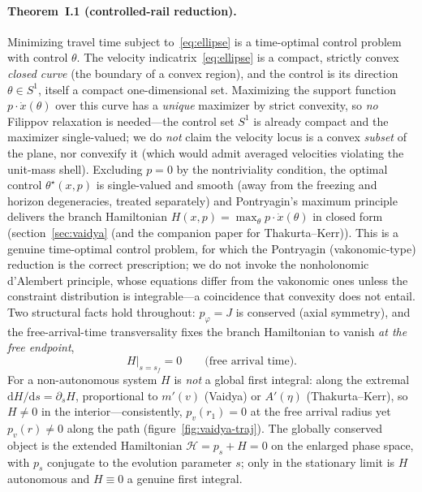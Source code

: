\documentclass[12pt]{iopart}
\newcommand{\dd}{\mathrm{d}}
\begin{document}
\paragraph{Theorem~I.1 (controlled-rail reduction).} Minimizing travel time subject
to~\eqref{eq:ellipse} is a time-optimal control problem with control $\theta$.
The velocity indicatrix~\eqref{eq:ellipse} is a compact, strictly convex
\emph{closed curve} (the boundary of a convex region), and the control is its
direction $\theta\in S^1$, itself a compact one-dimensional set. Maximizing the
support function $p\cdot\dot x(\theta)$ over this curve has a \emph{unique} maximizer
by strict convexity, so \emph{no} Filippov relaxation is needed---the control set
$S^1$ is already compact and the maximizer single-valued; we do \emph{not} claim the
velocity locus is a convex \emph{subset} of the plane, nor convexify it (which would
admit averaged velocities violating the unit-mass shell). Excluding $p=0$ by the
nontriviality condition, the optimal control $\theta^\star(x,p)$ is single-valued and
smooth (away from the freezing and horizon degeneracies, treated separately) and
Pontryagin's
maximum principle \cite{Pontryagin,Liberzon} delivers the branch Hamiltonian
$H(x,p)=\max_\theta p\cdot\dot x(\theta)$ in closed form
(section~\ref{sec:vaidya} (and the companion paper for Thakurta--Kerr)). This is a genuine time-optimal
control problem, for which the Pontryagin (vakonomic-type) reduction is the correct
prescription; we do not invoke the nonholonomic d'Alembert principle, whose
equations differ from the vakonomic ones unless the constraint distribution is
integrable---a coincidence that convexity does not entail. Two structural facts hold throughout: $p_\varphi=J$ is conserved (axial symmetry),
and the free-arrival-time transversality fixes the branch Hamiltonian to vanish
\emph{at the free endpoint},
\begin{equation}
    H\big|_{s=s_f}=0 \qquad\text{(free arrival time).}
    \label{eq:transversality}
\end{equation}
For a non-autonomous system $H$ is \emph{not} a global first integral: along the
extremal $\dd H/\dd s=\partial_s H$, proportional to $m'(v)$ (Vaidya) or $A'(\eta)$
(Thakurta--Kerr), so $H\neq0$ in the interior---consistently, $p_v(r_1)=0$ at the
free arrival radius yet $p_v(r)\neq0$ along the path (figure~\ref{fig:vaidya-traj}).
The globally conserved object is the extended Hamiltonian $\mathcal H=p_s+H=0$ on
the enlarged phase space, with $p_s$ conjugate to the evolution parameter $s$; only
in the stationary limit is $H$ autonomous and $H\equiv0$ a genuine first integral.
\end{document}
